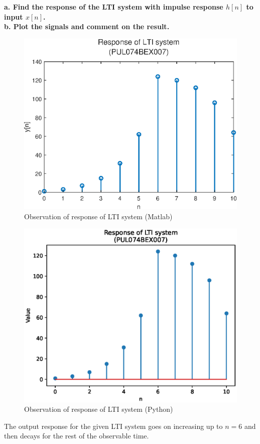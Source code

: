 \documentclass{lab_sheet}
\begin{document}
\textbf{a. Find the response of the LTI system with impulse response $h[n]$ to input $x[n]$.}\\
\textbf{b. Plot the signals and comment on the result.}
\begin{figure}[H]
	\centering
	\includegraphics[width=0.73\linewidth]{../Figures/lab_3_3_ml.eps}
	\caption{Observation of response of LTI system (Matlab)}
	\label{fig:3_3_ml}
\end{figure}
\begin{figure}[H]
	\centering
	\includegraphics[width=0.8\linewidth]{../Figures/lab_3_3_py.eps}
	\caption{Observation of response of LTI system (Python)}
	\label{fig:3_3_py}
\end{figure}
The output response for the given LTI system goes on increasing up to $n=6$ and then decays for the rest of the observable time.
\end{document}

